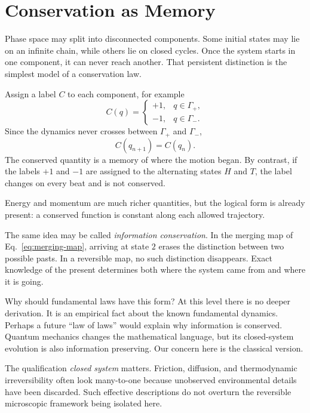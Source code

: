 \section{Conservation as Memory}

Phase space may split into disconnected components. Some initial states may lie on an infinite chain, while others lie on closed cycles. Once the system starts in one component, it can never reach another. That persistent distinction is the simplest model of a conservation law.

Assign a label \(C\) to each component, for example
\begin{equation}
 C(q)=
 \begin{cases}
 +1,&q\in\Gamma_{+},\\
 -1,&q\in\Gamma_{-}.
 \end{cases}
\end{equation}
Since the dynamics never crosses between \(\Gamma_{+}\) and \(\Gamma_{-}\),
\begin{equation}
 C(q_{n+1})=C(q_n).
\end{equation}
The conserved quantity is a memory of where the motion began. By contrast, if the labels \(+1\) and \(-1\) are assigned to the alternating states \(H\) and \(T\), the label changes on every beat and is not conserved.

Energy and momentum are much richer quantities, but the logical form is already present: a conserved function is constant along each allowed trajectory.

The same idea may be called \emph{information conservation}. In the merging map of Eq.~\eqref{eq:merging-map}, arriving at state \(2\) erases the distinction between two possible pasts. In a reversible map, no such distinction disappears. Exact knowledge of the present determines both where the system came from and where it is going.

Why should fundamental laws have this form? At this level there is no deeper derivation. It is an empirical fact about the known fundamental dynamics. Perhaps a future ``law of laws'' would explain why information is conserved. Quantum mechanics changes the mathematical language, but its closed-system evolution is also information preserving. Our concern here is the classical version.

The qualification \emph{closed system} matters. Friction, diffusion, and thermodynamic irreversibility often look many-to-one because unobserved environmental details have been discarded. Such effective descriptions do not overturn the reversible microscopic framework being isolated here.

